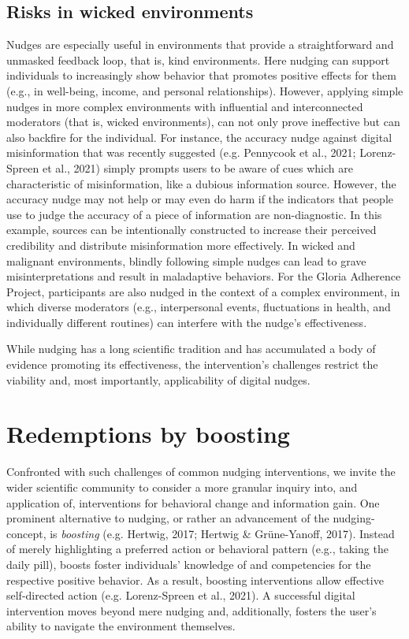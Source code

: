\documentclass[reflection, authordate,issue]{jote-new-article}
\begin{document}
\subsection{Risks in wicked environments}



Nudges are especially useful in environments that provide a straightforward and unmasked feedback loop, that is, kind environments. Here nudging can support individuals to increasingly show behavior that promotes positive effects for them (e.g., in well-being, income, and personal relationships). However, applying simple nudges in more complex environments with influential and interconnected moderators (that is, wicked environments), can not only prove ineffective but can also backfire for the individual. For instance, the accuracy nudge against digital misinformation that was recently suggested (e.g. Pennycook et al., 2021; Lorenz-Spreen et al., 2021) simply prompts users to be aware of cues which are characteristic of misinformation, like a dubious information source. However, the accuracy nudge may not help or may even do harm if the indicators that people use to judge the accuracy of a piece of information are non-diagnostic. In this example, sources can be intentionally constructed to increase their perceived credibility and distribute misinformation more effectively. In wicked and malignant environments, blindly following simple nudges can lead to grave misinterpretations and result in maladaptive behaviors. For the Gloria Adherence Project, participants are also nudged in the context of a complex environment, in which diverse moderators (e.g., interpersonal events, fluctuations in health, and individually different routines) can interfere with the nudge’s effectiveness.



While nudging has a long scientific tradition and has accumulated a body of evidence promoting its effectiveness, the intervention’s challenges restrict the viability and, most importantly, applicability of digital nudges.



\section{Redemptions by boosting}



Confronted with such challenges of common nudging interventions, we invite the wider scientific community to consider a more granular inquiry into, and application of, interventions for behavioral change and information gain. One prominent alternative to nudging, or rather an advancement of the nudging-concept, is \emph{boosting} (e.g. Hertwig, 2017; Hertwig \& Grüne-Yanoff, 2017). Instead of merely highlighting a preferred action or behavioral pattern (e.g., taking the daily pill), boosts foster individuals’ knowledge of and competencies for the respective positive behavior. As a result, boosting interventions allow effective self-directed action (e.g. Lorenz-Spreen et al., 2021). A successful digital intervention moves beyond mere nudging and, additionally, fosters the user’s ability to navigate the environment themselves.
\end{document}

